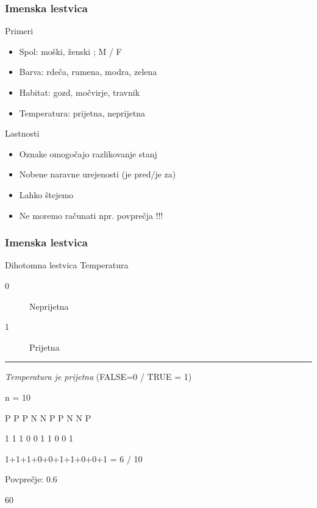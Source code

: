 \begin{frame}[fragile]
\frametitle{Imenska lestvica}
\begin{block}{Primeri}

\begin{itemize}
  \item Spol: moški, ženski ; M / F
  \item Barva: rdeča, rumena, modra, zelena
  \item Habitat: gozd, močvirje, travnik
  \item Temperatura: prijetna, neprijetna
\end{itemize}
\end{block}
\begin{block}{Lastnosti}

\begin{itemize}
  \item Oznake omogočajo razlikovanje stanj
  \item Nobene naravne urejenosti (je pred/je za)
  \item Lahko štejemo
  \item Ne moremo računati npr. povprečja !!!
  \end{itemize}
\end{block}

\end{frame}

\begin{frame}[fragile]
\frametitle{Imenska lestvica}
\begin{block}{Dihotomna lestvica}
Temperatura
\begin{description}
  \item[0] Neprijetna
  \item[1] Prijetna
\end{description}
\vspace{6pt}
\hrule
\vspace{6pt}
\emph{Temperatura je prijetna} (FALSE=0 / TRUE = 1)

\end{block}
\begin{Schunk}
\begin{Soutput}
n = 10
\end{Soutput}
\begin{Soutput}
P P P N N P P N N P
\end{Soutput}
\begin{Soutput}
1 1 1 0 0 1 1 0 0 1
\end{Soutput}
\begin{Soutput}
1+1+1+0+0+1+1+0+0+1 = 6 / 10
\end{Soutput}
\begin{Soutput}
Povprečje: 0.6
\end{Soutput}
\begin{Soutput}
60% enot ima lastnost iz trditve (prijetno)
\end{Soutput}
\end{Schunk}

\end{frame}



